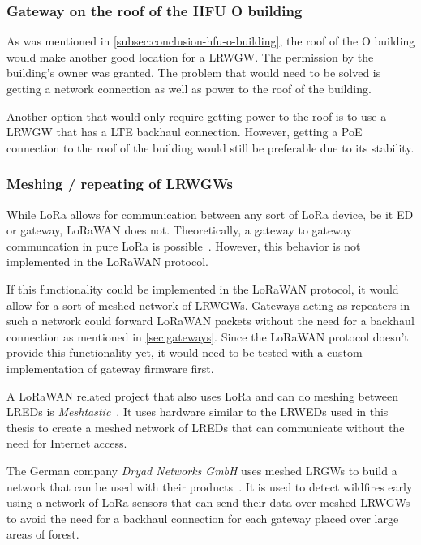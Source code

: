 \subsubsection{Gateway on the roof of the \acl{HFU} O building}

As was mentioned in \cref{subsec:conclusion-hfu-o-building}, the roof of the O building would make another good location for a \acl{LRWGW}.
The permission by the building's owner was granted.
The problem that would need to be solved is getting a network connection as well as power to the roof of the building.

Another option that would only require getting power to the roof is to use a \acl{LRWGW} that has a \ac{LTE} backhaul connection.
However, getting a \ac{PoE} connection to the roof of the building would still be preferable due to its stability.

\subsubsection{Meshing / repeating of \aclp{LRWGW}}

While \ac{LoRa} allows for communication between any sort of \ac{LoRa} device, be it \acl{ED} or gateway, \ac{LoRaWAN} does not.
Theoretically, a gateway to gateway communcation in pure \ac{LoRa} is possible~\cite{dwijaksara_multihop_2019}.
However, this behavior is not implemented in the \ac{LoRaWAN} protocol.

If this functionality could be implemented in the \ac{LoRaWAN} protocol, it would allow for a sort of meshed network of \aclp{LRWGW}.
Gateways acting as repeaters in such a network could forward \ac{LoRaWAN} packets without the need for a backhaul connection as mentioned in \cref{sec:gateways}.
Since the \ac{LoRaWAN} protocol doesn't provide this functionality yet, it would need to be tested with a custom implementation of gateway firmware first.

A \ac{LoRaWAN} related project that also uses \ac{LoRa} and can do meshing between \aclp{LRED} is \emph{Meshtastic}~\cite{meshtastic_llc_meshtastic_2023}.
It uses hardware similar to the \aclp{LRWED} used in this thesis to create a meshed network of \aclp{LRED} that can communicate without the need for Internet access.

The German company \emph{Dryad Networks GmbH} uses meshed \aclp{LRGW} to build a network that can be used with their products~\cite{dryad_networks_gmbh_silvanet_2023}.
It is used to detect wildfires early using a network of \ac{LoRa} sensors that can send their data over meshed \aclp{LRWGW} to avoid the need for a backhaul connection for each gateway placed over large areas of forest.

